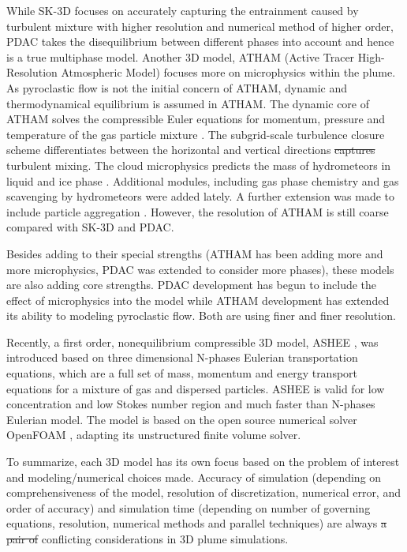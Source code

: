 \documentclass[gmd, manuscript]{copernicus} %
\providecommand{\DIFadd}[1]{{\protect\color{blue}\uwave{#1}}} %
\providecommand{\DIFdel}[1]{{\protect\color{red}\sout{#1}}}                      %
\providecommand{\DIFaddbegin}{} %
\providecommand{\DIFaddend}{} %
\providecommand{\DIFdelbegin}{} %
\providecommand{\DIFdelend}{} %
\begin{document}
While SK-3D focuses on accurately capturing the entrainment caused by turbulent mixture with higher resolution and numerical method of higher order, PDAC takes the disequilibrium between different phases into account and hence is a true multiphase model. Another 3D model, ATHAM (Active Tracer High-Resolution Atmospheric Model) \citep{oberhuber1998volcanic} focuses more on microphysics within the plume. As pyroclastic flow is not the initial concern of ATHAM, dynamic and thermodynamical equilibrium is assumed in ATHAM. The dynamic core of ATHAM solves the compressible Euler equations for momentum, pressure and temperature of the gas particle mixture \citep{oberhuber1998volcanic}. The subgrid-scale turbulence closure scheme \DIFaddbegin \DIFadd{that }\DIFaddend differentiates between the horizontal and vertical directions \citep{herzog2003prognostic} \DIFdelbegin \DIFdel{captures }\DIFdelend \DIFaddbegin \DIFadd{is adopted to capture }\DIFaddend turbulent mixing. The cloud microphysics predicts the mass of hydrometeors in liquid and ice phase \citep{herzog1998effect}. Additional modules, including gas phase chemistry \citep{trentmann2002simulation} and gas scavenging by hydrometeors \citep{textor2003injection} were added lately. A further extension was made to include particle aggregation \citep{textor2006volcanic1, textor2006volcanic2}. However, the resolution of ATHAM is still coarse compared with SK-3D and PDAC.

Besides adding to their special strengths (ATHAM has been adding more and more microphysics, PDAC was extended to consider more phases), these models are also adding core strengths. PDAC development has begun to include the effect of microphysics into the model while ATHAM development has extended its ability to modeling pyroclastic flow. Both are using finer and finer resolution. 

Recently, a first order, nonequilibrium compressible 3D model, ASHEE \citep{cerminara2016ashee}, was introduced based on three dimensional N-phases Eulerian transportation equations, which are a full set of mass, momentum and energy transport equations for a mixture of gas and dispersed particles. ASHEE is valid for low concentration and low Stokes number region and much faster than N-phases Eulerian model. The model is based on the open source numerical solver OpenFOAM \citep{weller1998tensorial}, adapting its unstructured finite volume solver.

To summarize, each 3D model has its own focus based on the problem of interest and modeling/numerical choices made.
 Accuracy of simulation (depending on comprehensiveness of the model, resolution of discretization, numerical error, and order of accuracy) and simulation time (depending on number of governing equations, resolution, numerical methods and parallel techniques) are always \DIFdelbegin \DIFdel{a pair of }\DIFdelend conflicting considerations in 3D plume simulations.
\DIFdelbegin %
\DIFdelend 
\end{document}
